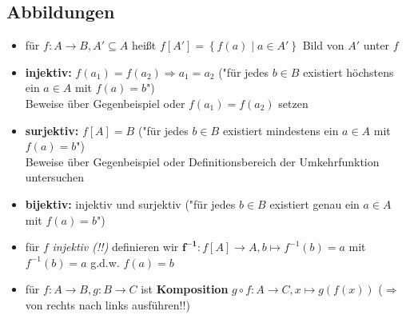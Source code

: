 \documentclass[10pt,a4paper]{article}
\begin{document}
\subsection{Abbildungen}
\begin{itemize}
\item für $f: A\rightarrow B, A'\subseteq A$ heißt $f[A']=\left\lbrace f(a)\mid a \in A'\right\rbrace$ Bild von $A'$ unter $f$
\item \textbf{injektiv:} $f(a_{1})=f(a_{2}) \Rightarrow a_{1}=a_{2}$ ("für jedes $b\in B$ existiert höchstens ein $a\in A$ mit $f(a)=b$")\\
Beweise über Gegenbeispiel oder $f(a_{1})=f(a_{2})$ setzen 
\item \textbf{surjektiv:} $f[A]=B$ ("für jedes $b\in B$ existiert mindestens ein $a\in A$ mit $f(a)=b$")\\ Beweise über Gegenbeispiel oder Definitionsbereich der Umkehrfunktion untersuchen 
\item \textbf{bijektiv:} injektiv und surjektiv ("für jedes $b\in B $ existiert genau ein $a\in A$ mit $f(a)=b$")
\item für $f$ \textit{injektiv (!!)}  definieren wir $\boldsymbol{f^{-1}: }f[A]\rightarrow A, b\mapsto f^{-1}(b)=a$ mit $f^{-1}(b)=a$  g.d.w. $f(a)=b$
\item für $f:A\rightarrow B, g: B\rightarrow C$ ist \textbf{Komposition} $ g\circ f:A\rightarrow C, x \mapsto g(f(x))$ ($\Rightarrow$ von rechts nach links ausführen!!)
\end{itemize}
\end{document}
